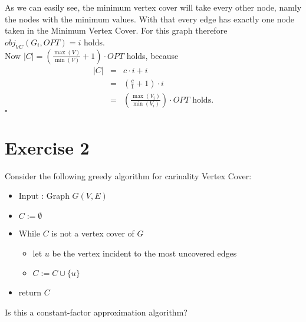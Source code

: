 \documentclass[11pt,a4paper,ngerman]{article}
\begin{document}
\begin{description}
As we can easily see, the minimum vertex cover will take every other node, namly the nodes with the minimum values. With that every edge has exactly one node taken in the Minimum Vertex Cover. For this graph therefore $obj_{VC}(G_i, OPT) = i$ holds.\\

Now $|C| = \left( \frac{\max (V)}{\min (V)} + 1 \right) \cdot OPT$ holds, because
$$
\begin{array}{rcl}
	|C|	&=& c \cdot i + i\\
		&=& \left( \frac{c}{1} + 1 \right) \cdot i\\
		&=& \left( \frac{\max (V_i) }{ \min (V_i) }\right) \cdot OPT \text{ holds.}
\end{array}
$$
\mbox{} \hfill $\square$
\end{description} 


\pagebreak

\section*{Exercise 2}
Consider the following greedy algorithm for carinality Vertex Cover:
\begin{itemize}
	\item Input : Graph $G(V,E)$
	\item $C := \emptyset$
	\item While $C$ is not a vertex cover of $G$
		\begin{itemize}
			\item let $u$ be the vertex incident to the most uncovered edges
			\item $C := C \cup \{ u \}$
		\end{itemize}
	\item return $C$
\end{itemize}
Is this a constant-factor approximation algorithm?\\
\end{document}
